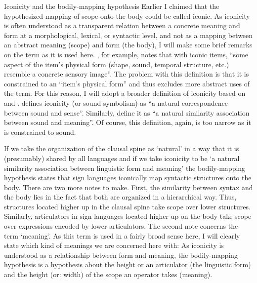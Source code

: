 \begin{exe}
\ex\label{smilingexample}\begin{xlist} 
\end{xlist}
\end{exe} 
%

\begin{digression}{Iconicity and the bodily-mapping hypothesis}{}\label{iconicity}
\noindent Earlier I claimed that the hypothesized mapping of scope onto the body could be called iconic. As iconicity is often understood as a transparent relation between a concrete meaning and form at a morphological, lexical, or syntactic level, and not as a mapping between an abstract meaning (scope) and form (the body), I will make some brief remarks on the term as it is used here. \citet[20]{taub2004iconicity}, for example, notes that with iconic items, ``some aspect of the item's physical form (shape, sound, temporal structure, etc.) resemble a concrete sensory image''. The problem with this definition is that it is constrained to an ``item's physical form'' and thus excludes more abstract uses of the term. For this reason, I will adopt a broader definition of iconicity based on \citet{jespersen1922language} and \citet{jakobsonwaugh1979soundshape}. \citet[396]{jespersen1922language} defines iconicity (or sound symbolism)  as ``a natural correspondence between sound and sense''. Similarly, \citet[178]{jakobsonwaugh1979soundshape} define it as ``a natural similarity association between sound and meaning''. Of course, this definition, again, is too narrow as it is constrained to sound. 

If we take the organization of the clausal spine as `natural' in a way that it is (presumably) shared by all languages and if we take iconicity to be `a natural similarity association between linguistic form and meaning' the bodily-mapping hypothesis states that sign languages iconically map syntactic structures onto the body. There are two more notes to make. First, the similarity between syntax and the body lies in the fact that both are organized in a hierarchical way. Thus, structures located higher up in the clausal spine take scope over lower structures. Similarly, articulators in sign languages located higher up on the body take scope over expressions encoded by lower articulators. The second note concerns the term `meaning'. As this term is used in a fairly broad sense here, I will clearly state which kind of meanings we are concerned here with: As iconicity is understood as a relationship between form and meaning, the bodily-mapping hypothesis is a hypothesis about the height or an articulator (the linguistic form) and the height (or: width) of the scope an operator takes (meaning).


\end{digression}
